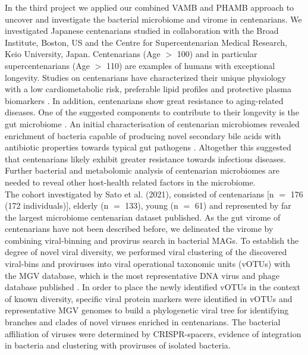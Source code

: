 In the third project we applied our combined VAMB and PHAMB approach to uncover and investigate the bacterial microbiome and virome in centenarians. We investigated Japanese centenarians studied in collaboration with the Broad Institute, Boston, US and the Centre for Supercentenarian Medical Research, Keio University, Japan. Centenarians (Age $>$ 100) and in particular supercentenarians (Age $>$ 110) are examples of humans with exceptional longevity. Studies on centenarians have characterized their unique physiology with a low cardiometabolic risk, preferable lipid profiles and protective plasma biomarkers \cite{Hirata2020-za,Barzilai2004-fd}. In addition, centenarians show great resistance to aging-related diseases. One of the suggested components to contribute to their longevity is the gut microbiome \cite{Wilmanski2021-ov}. An initial characterisation of centenarian microbiomes revealed enrichment of bacteria capable of producing novel secondary bile acids with antibiotic properties towards typical gut pathogens \cite{Sato2021-zh}. Altogether this suggested that centenarians likely exhibit greater resistance towards infectious diseases. Further bacterial and metabolomic analysis of centenarian microbiomes are needed to reveal other host-health related factors in the microbiome.\\

\noindent
The cohort investigated by Sato et al. (2021), consisted of centenarians [n $=$ 176 (172 individuals)], elderly (n $=$ 133), young (n $=$ 61) and represented by far the largest microbiome centenarian dataset published. As the gut virome of centenarians have not been described before, we delineated the virome by combining viral-binning and provirus search in bacterial MAGs. To establish the degree of novel viral diversity, we performed viral clustering of the discovered viral-bins and proviruses into viral operational taxonomic units (vOTUs) with the MGV database, which is the most representative DNA virus and phage database published \cite{Nayfach2021-tq}. In order to place the newly identified vOTUs in the context of known diversity, specific viral protein markers were identified in vOTUs and representative MGV genomes to build a phylogenetic viral tree for identifying branches and clades of novel viruses enriched in centenarians. The bacterial affiliation of viruses were determined by CRISPR-spacers, evidence of integration in bacteria and clustering with proviruses of isolated bacteria.\\

